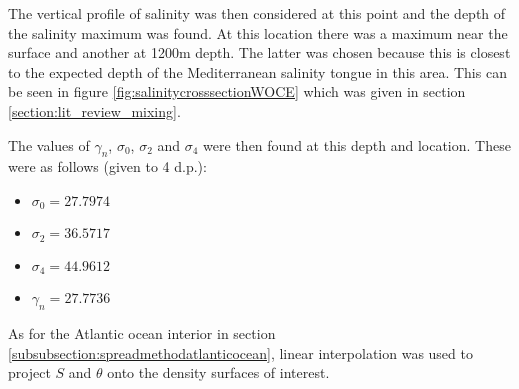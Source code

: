 The vertical profile of salinity was then considered at this point and the depth of the salinity maximum was found. At this location there was a maximum near the surface and another at 1200m depth. The latter was chosen because this is closest to the expected depth of the Mediterranean salinity tongue in this area. This can be seen in figure \ref{fig:salinitycrosssectionWOCE} which was given in section \ref{section:lit_review_mixing}. 

The values of $\gamma_n$, $\sigma_0$, $\sigma_2$ and $\sigma_4$ were then found at this depth and location. These were as follows (given to 4 d.p.):

\begin{itemize}
    \item $\sigma_0= 27.7974$
    \item $\sigma_2= 36.5717$
    \item $\sigma_4= 44.9612$
    \item $\gamma_n= 27.7736$
\end{itemize}

As for the Atlantic ocean interior in section \ref{subsubsection:spreadmethodatlanticocean}, linear interpolation was used to project $S$ and $\theta$ onto the density surfaces of interest. 

